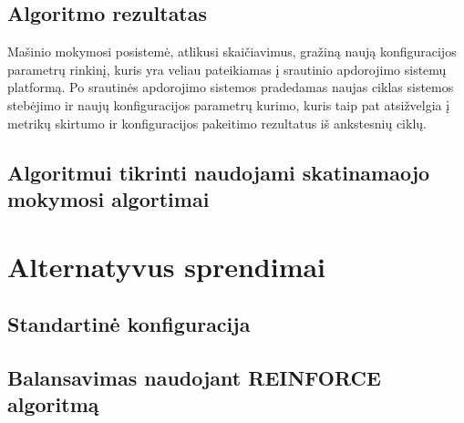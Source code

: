 \documentclass{VUMIFPSbakalaurinis}
\begin{document}
\subsection{Algoritmo rezultatas}
Mašinio mokymosi posistemė, atlikusi skaičiavimus, gražiną naują konfiguracijos parametrų rinkinį, kuris yra veliau pateikiamas į srautinio apdorojimo sistemų platformą. Po srautinės apdorojimo sistemos pradedamas naujas ciklas sistemos stebėjimo ir naujų konfiguracijos parametrų kurimo, kuris taip pat atsižvelgia į metrikų skirtumo ir konfiguracijos pakeitimo rezultatus iš  ankstesnių ciklų.

\subsection{Algoritmui tikrinti naudojami skatinamaojo mokymosi algortimai}

\section{Alternatyvus sprendimai}

\subsection{Standartinė konfiguracija}

\subsection{Balansavimas naudojant REINFORCE algoritmą}


\printbibliography[heading=bibintoc] 
\end{document}
